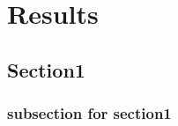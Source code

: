 \documentclass[thesis.tex]{subfiles}
\begin{document}
\chapter{Results}

\section{Section1}


\subsection{subsection for section1}
\end{document}
